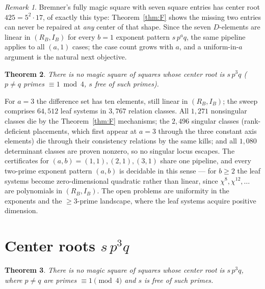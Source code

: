 \documentclass[11pt]{article}
\newtheorem{theorem}{Theorem}
\theoremstyle{remark}
\newtheorem{remark}[theorem]{Remark}
\begin{document}
\begin{remark}
Bremner's fully magic square with seven square entries has center root
$425=5^2\cdot17$, of exactly this type: Theorem~\ref{thm:F} shows the missing
two entries can never be repaired at \emph{any} center of that shape.
Since the seven $D$-elements are linear in $(R_B,I_B)$ for every $b=1$
exponent pattern $s\,p^aq$, the same pipeline applies to all $(a,1)$ cases;
the case count grows with $a$, and a uniform-in-$a$ argument is the natural
next objective.
\end{remark}

\begin{theorem}\label{thm:G}
There is no magic square of squares whose center root is $s\,p^3q$
($p\neq q$ primes $\equiv 1 \bmod 4$, $s$ free of such primes).
\end{theorem}

For $a=3$ the difference set has ten elements, still linear in $(R_B,I_B)$;
the sweep comprises $64{,}512$ leaf systems in $3{,}767$ relation classes.
All $1{,}271$ nonsingular classes die by the Theorem~\ref{thm:F} mechanisms;
the $2{,}496$ singular classes (rank-deficient placements, which first appear
at $a=3$ through the three constant axis elements) die through their
consistency relations by the same kills; and all $1{,}080$ determinant
classes are proven nonzero, so no singular locus escapes.  The certificates
for $(a,b)=(1,1),(2,1),(3,1)$ share one pipeline, and every two-prime
exponent pattern $(a,b)$ is decidable in this sense --- for $b\ge 2$ the leaf
systems become zero-dimensional quadratic rather than linear, since
$\chi^{8},\chi^{12},\dots$ are polynomials in $(R_B,I_B)$.  The open
problems are uniformity in the exponents and the $\ge 3$-prime landscape,
where the leaf systems acquire positive dimension.


\section{Center roots $s\,p^3q$}

\begin{theorem}\label{thm:G}
There is no magic square of squares whose center root is $s\,p^3q$, where
$p\neq q$ are primes $\equiv 1\pmod 4$ and $s$ is free of such primes.
\end{theorem}
\end{document}
